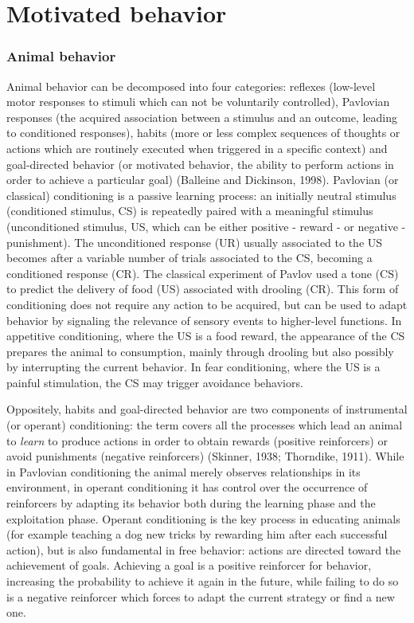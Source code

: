 \documentclass[
  11pt,
  a4paper,
]{scrbook}
\begin{document}
\section{Motivated behavior}\label{motivated-behavior}

\subsubsection*{Animal behavior}\label{animal-behavior}

Animal behavior can be decomposed into four categories: reflexes
(low-level motor responses to stimuli which can not be voluntarily
controlled), Pavlovian responses (the acquired association between a
stimulus and an outcome, leading to conditioned responses), habits (more
or less complex sequences of thoughts or actions which are routinely
executed when triggered in a specific context) and goal-directed
behavior (or motivated behavior, the ability to perform actions in order
to achieve a particular goal) (Balleine and Dickinson, 1998). Pavlovian
(or classical) conditioning is a passive learning process: an initially
neutral stimulus (conditioned stimulus, CS) is repeatedly paired with a
meaningful stimulus (unconditioned stimulus, US, which can be either
positive - reward - or negative - punishment). The unconditioned
response (UR) usually associated to the US becomes after a variable
number of trials associated to the CS, becoming a conditioned response
(CR). The classical experiment of Pavlov used a tone (CS) to predict the
delivery of food (US) associated with drooling (CR). This form of
conditioning does not require any action to be acquired, but can be used
to adapt behavior by signaling the relevance of sensory events to
higher-level functions. In appetitive conditioning, where the US is a
food reward, the appearance of the CS prepares the animal to
consumption, mainly through drooling but also possibly by interrupting
the current behavior. In fear conditioning, where the US is a painful
stimulation, the CS may trigger avoidance behaviors.

Oppositely, habits and goal-directed behavior are two components of
instrumental (or operant) conditioning: the term covers all the
processes which lead an animal to \emph{learn} to produce actions in
order to obtain rewards (positive reinforcers) or avoid punishments
(negative reinforcers) (Skinner, 1938; Thorndike, 1911). While in
Pavlovian conditioning the animal merely observes relationships in its
environment, in operant conditioning it has control over the occurrence
of reinforcers by adapting its behavior both during the learning phase
and the exploitation phase. Operant conditioning is the key process in
educating animals (for example teaching a dog new tricks by rewarding
him after each successful action), but is also fundamental in free
behavior: actions are directed toward the achievement of goals.
Achieving a goal is a positive reinforcer for behavior, increasing the
probability to achieve it again in the future, while failing to do so is
a negative reinforcer which forces to adapt the current strategy or find
a new one.
\end{document}
